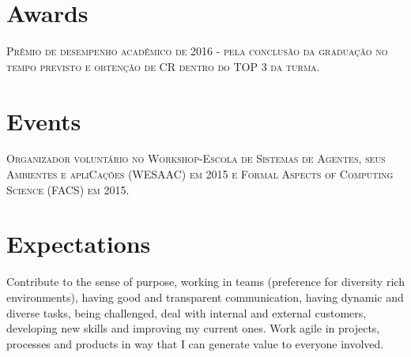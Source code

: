 \documentclass[a4paper,10pt]{article}
\begin{document}
\section {Awards}
\textsc{Prêmio de desempenho acadêmico de 2016 - pela conclusão da graduação no tempo previsto e obtenção de CR dentro do TOP 3 da turma.}

\section {Events}
\textsc{Organizador voluntário no Workshop-Escola de Sistemas de Agentes, seus Ambientes e apliCações (WESAAC) em 2015 e Formal Aspects of Computing Science (FACS) em 2015.}

\section {Expectations}
Contribute to the sense of purpose, working in teams (preference for diversity rich environments), having good and transparent communication, having dynamic and diverse tasks, being challenged, deal with internal and external customers, developing new skills and improving my current ones. Work agile in projects, processes and products in way that I can generate value to everyone involved.   
\end{document}
